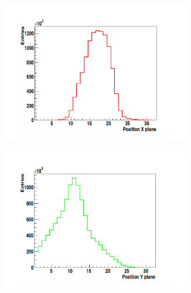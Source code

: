 \begin{figure}
\begin{subfigure}[b]{.5\textwidth}
\centering
\includegraphics[width=0.9\textwidth]{03_GraphicFiles/chapter6_BeamTests/Nice_May2018/profileX.png}
\caption{}
\label{chap6::fig::May_HodoprofX}
\end{subfigure}
\begin{subfigure}[b]{.5\textwidth}
\centering
\includegraphics[width=0.9\textwidth]{03_GraphicFiles/chapter6_BeamTests/Nice_May2018/profileY.png}	
\caption{}
\label{chap6::fig::May_HodoprofY}
\end{subfigure}
\caption{}
\label{chap6::fig::May_Hodoprof1D}
\end{figure}

